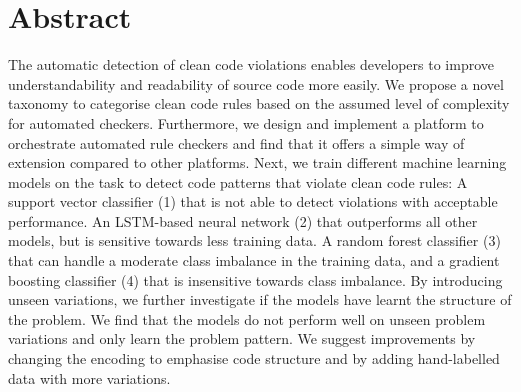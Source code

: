 \section*{Abstract}    
The automatic detection of clean code violations enables developers to improve understandability and readability of source code more easily. We propose a novel taxonomy to categorise clean code rules based on the assumed level of complexity for automated checkers. Furthermore, we design and implement a platform to orchestrate automated rule checkers and find that it offers a simple way of extension compared to other platforms. Next, we train different machine learning models on the task to detect code patterns that violate clean code rules: A support vector classifier (1) that is not able to detect violations with acceptable performance. An LSTM-based neural network (2) that outperforms all other models, but is sensitive towards less training data. A random forest classifier (3) that can handle a moderate class imbalance in the training data, and a gradient boosting classifier (4) that is insensitive towards class imbalance. By introducing unseen variations, we further investigate if the models have learnt the structure of the problem. We find that the models do not perform well on unseen problem variations and only learn the problem pattern. We suggest improvements by changing the encoding to emphasise code structure and by adding hand-labelled data with more variations.